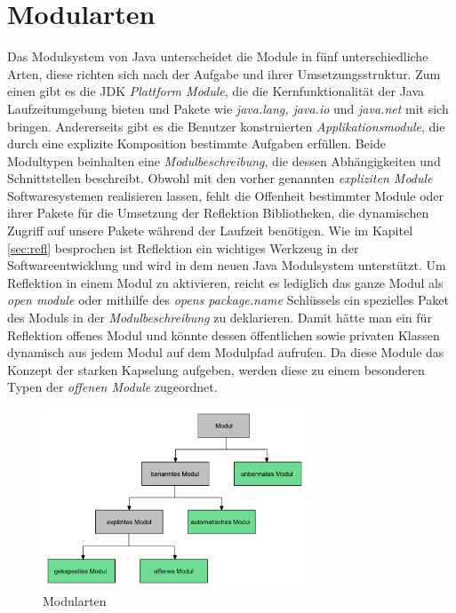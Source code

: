   \section{Modularten} \label{Modularten}
    Das Modulsystem von Java unterscheidet die Module in fünf unterschiedliche Arten, diese richten sich nach der Aufgabe und ihrer Umsetzungsstruktur. Zum einen gibt es die JDK \textit{Plattform Module}, die die Kernfunktionalität der Java Laufzeitumgebung bieten und Pakete wie \textit{java.lang, java.io} und \textit{java.net} mit sich bringen. Andererseits gibt es die Benutzer konstruierten \textit{Applikationsmodule}, die durch eine explizite Komposition bestimmte Aufgaben erfüllen. Beide Modultypen beinhalten eine \textit{Modulbeschreibung}, die dessen Abhängigkeiten und Schnittstellen beschreibt.\newline
    Obwohl mit den vorher genannten \textit{expliziten Module} Softwaresystemen realisieren lassen, fehlt die Offenheit bestimmter Module oder ihrer Pakete für die Umsetzung der Reflektion Bibliotheken, die dynamischen Zugriff auf unsere Pakete während der Laufzeit benötigen. Wie im Kapitel \ref{sec:refl} besprochen ist Reflektion ein wichtiges Werkzeug in der Softwareentwicklung und wird in dem neuen Java Modulsystem unterstützt. Um Reflektion in einem Modul zu aktivieren, reicht es lediglich das ganze Modul als \textit{open module} oder mithilfe des \textit{opens package.name} Schlüssels ein spezielles Paket des Moduls in der \textit{Modulbeschreibung} zu deklarieren. Damit hätte man ein für Reflektion offenes Modul und könnte dessen öffentlichen sowie privaten Klassen dynamisch aus jedem Modul auf dem Modulpfad aufrufen. Da diese Module das Konzept der starken Kapselung aufgeben, werden diese zu einem besonderen Typen der \textit{offenen Module} zugeordnet. \cite{modulMitJava9,java9modRevealed,modulProgJava9,explorJava9}

    \begin{figure}[h]
      \centering
      \includegraphics[width=0.7\textwidth]{material/images/module-tree.pdf}
      \caption{Modularten \cite{modulMitJava9}}
      \label{fig:modtree}
    \end{figure}

